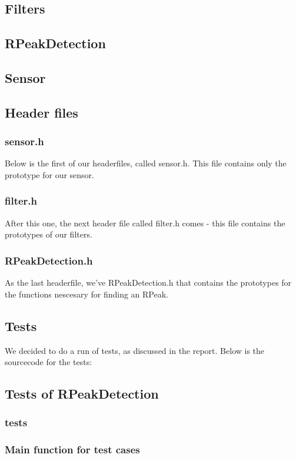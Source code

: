 \documentclass[12pt,a4paper]{article}
\begin{document}
\subsection{Filters}
	
\subsection{RPeakDetection}
		
\subsection{Sensor}
		
\subsection{Header files}
\subsubsection{sensor.h}
	Below is the first of our headerfiles, called sensor.h. This file contains only the prototype for our sensor.\\
	
\subsubsection{filter.h}
	After this one, the next header file called filter.h comes - this file contains the prototypes of our filters.\\
	
\subsubsection{RPeakDetection.h}
	As the last headerfile, we've RPeakDetection.h that contains the prototypes for the functions nescesary for finding an RPeak.
	
\subsection{Tests}
	We decided to do a run of tests, as discussed in the report. Below is the sourcecode for the tests:
\subsection{Tests of RPeakDetection}
	
\subsubsection{tests}
	
\subsubsection{Main function for test cases}
	
\end{document}
